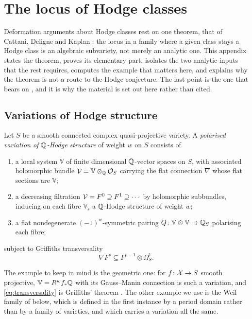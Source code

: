 \section{The locus of Hodge classes}\label{app:cdk}

Deformation arguments about Hodge classes rest on one theorem, that of
Cattani, Deligne and Kaplan \cite{CDK95}: the locus in a family where a given
class stays a Hodge class is an algebraic subvariety, not merely an analytic
one. This appendix states the theorem, proves its elementary part, isolates
the two analytic inputs that the rest requires, computes the example that
matters here, and explains why the theorem is not a route to the Hodge
conjecture. The last point is the one that bears on ,
and it is why the material is set out here rather than cited.

\subsection{Variations of Hodge structure}

\begin{definition}\label{def:vhs}
Let $S$ be a smooth connected complex quasi-projective variety. A
\emph{polarised variation of $\mathbb{Q}$-Hodge structure} of weight $w$ on $S$
consists of
\begin{enumerate}[label=\textup{(\alph*)},nosep]
\item a local system $\mathbb{V}$ of finite dimensional $\mathbb{Q}$-vector spaces on
  $S$, with associated holomorphic bundle
  $\mathcal{V}=\mathbb{V}\otimes_{\mathbb{Q}}\mathcal{O}_{S}$ carrying the flat connection $\nabla$
  whose flat sections are $\mathbb{V}$;
\item a decreasing filtration $\mathcal{V}=F^{0}\supseteq F^{1}\supseteq\cdots$ by
  holomorphic subbundles, inducing on each fibre $\mathbb{V}_{s}$ a
  $\mathbb{Q}$-Hodge structure of weight $w$;
\item a flat nondegenerate $(-1)^{w}$-symmetric pairing
  $Q\colon\mathbb{V}\otimes\mathbb{V}\to\mathbb{Q}_{S}$ polarising each fibre;
\end{enumerate}
subject to Griffiths transversality
\begin{equation}\label{eq:transversality}
  \nabla F^{p}\subseteq F^{p-1}\otimes\Omega^{1}_{S}.
\end{equation}
\end{definition}

The example to keep in mind is the geometric one: for $f\colon\mathcal{X}\to S$ smooth
projective, $\mathbb{V}=R^{w}f_{*}\mathbb{Q}$ with its Gauss--Manin connection is such
a variation, and \eqref{eq:transversality} is Griffiths' theorem
\cite[Ch.~10]{Voi02}. The other example we use is the Weil family of
 below, which is defined in the first instance by a
period domain rather than by a family of varieties, and which carries a
variation all the same.

